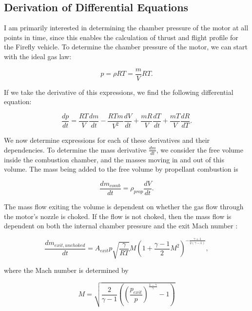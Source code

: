 \documentclass[12pt, letterpaper]{article}
\begin{document}
\subsection{Derivation of Differential Equations}

I am primarily interested in determining the chamber pressure of the motor at all points in time, since this enables the calculation of thrust and flight profile for the Firefly vehicle. To determine the chamber pressure of the motor, we can start with the ideal gas law:

\begin{equation}
  p = \rho R T = \frac{m}{V} R T .
\end{equation}

If we take the derivative of this expressions, we find the following differential equation:

\begin{equation}
  \frac{dp}{dt} = \frac{R T}{V} \frac{dm}{dt} - \frac{R T m}{V^2} \frac{dV}{dt} + \frac{m R}{V} \frac{dT}{dt} + \frac{m T}{V}\frac{dR}{dT} .
\end{equation}

We now determine expressions for each of these derivatives and their dependencies. To determine the mass derivative $\frac{dm}{dt}$, we consider the free volume inside the combustion chamber, and the masses moving in and out of this volume. The mass being added to the free volume by propellant combustion is

\begin{equation}
  \frac{dm_{comb}}{dt} = \rho_{prop} \frac{dV}{dt}.
\end{equation}

The mass flow exiting the volume is dependent on whether the gas flow through the motor's nozzle is choked. If the flow is not choked, then the mass flow is dependent on both the internal chamber pressure and the exit Mach number :

\begin{equation}
  \frac{dm_{exit, unchoked}}{dt} = A_{exit} p \sqrt{\frac{\gamma}{R T}} M \left( 1 + \frac{\gamma - 1}{2} M^2 \right)^{- \frac{\gamma + 1}{2 (\gamma - 1)}}, 
\end{equation}

where the Mach number is determined by

\begin{equation}
  M = \sqrt{ \frac{2}{\gamma - 1} \left( { \left( \frac{p_{exit}}{p} \right)}^{\frac{1 - \gamma}{\gamma}} - 1 \right)}
\end{equation}
\end{document}
